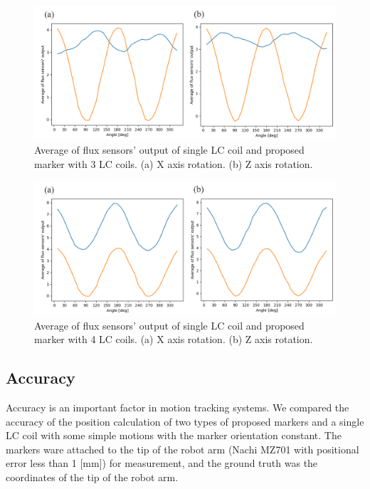 \documentclass[journal,twoside,web]{ieeecolor}
\begin{document}
\begin{figure}[!t]
    \centerline{\includegraphics[width=\columnwidth]{figure/angle_characteristics_3LC.png}}
    \caption{Average of flux sensors' output of single LC coil and proposed marker with 3 LC coils. (a) X axis rotation. (b) Z axis rotation.}
    \label{angle_characteristics_3LC}
\end{figure}
\begin{figure}[!t]
    \centerline{\includegraphics[width=\columnwidth]{figure/angle_characteristics_4LC.png}}
    \caption{Average of flux sensors' output of single LC coil and proposed marker with 4 LC coils. (a) X axis rotation. (b) Z axis rotation.}
    \label{angle_characteristics_4LC}
\end{figure}

\subsection{Accuracy}
Accuracy is an important factor in motion tracking systems. We compared the accuracy of the position calculation of two types of proposed markers and a single LC coil with some simple motions with the marker orientation constant. The markers ware attached to the tip of the robot arm (Nachi MZ701 with positional error less than 1 [mm]) for measurement, and the ground truth was the coordinates of the tip of the robot arm.
\end{document}
